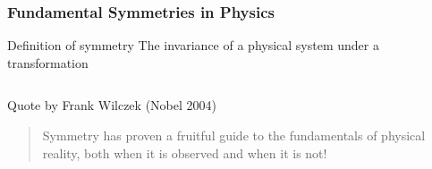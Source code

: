 \begin{frame}
 \frametitle{Fundamental Symmetries in Physics}
 \begin{block}{Definition of symmetry}
  The \alert{invariance} of a physical system \alert{under a transformation}
 \end{block}
 \vspace{\baselineskip}
 \begin{columns}[T]
  \begin{block}{Quote by Frank Wilczek (Nobel 2004)}
   \begin{quote}
    Symmetry has proven a fruitful guide to the fundamentals of physical reality, both when it is observed and when it is not!
   \end{quote}
  \end{block}
 \end{columns}
\end{frame}
